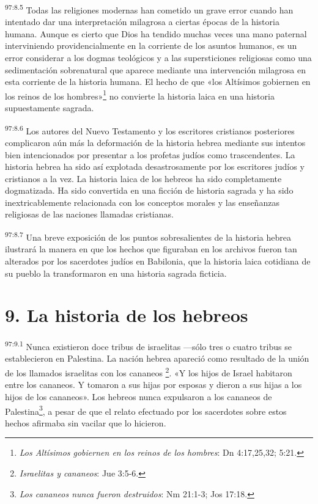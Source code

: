 \par
\textsuperscript{97:8.5} Todas las religiones modernas han cometido un grave error cuando han intentado dar una interpretación milagrosa a ciertas épocas de la historia humana. Aunque es cierto que Dios ha tendido muchas veces una mano paternal interviniendo providencialmente en la corriente de los asuntos humanos, es un error considerar a los dogmas teológicos y a las supersticiones religiosas como una sedimentación sobrenatural que aparece mediante una intervención milagrosa en esta corriente de la historia humana. El hecho de que «los Altísimos gobiernen en los reinos de los hombres»\footnote{\textit{Los Altísimos gobiernen en los reinos de los hombres}: Dn 4:17,25,32; 5:21.} no convierte la historia laica en una historia supuestamente sagrada.

\par
\textsuperscript{97:8.6} Los autores del Nuevo Testamento y los escritores cristianos posteriores complicaron aún más la deformación de la historia hebrea mediante sus intentos bien intencionados por presentar a los profetas judíos como trascendentes. La historia hebrea ha sido así explotada desastrosamente por los escritores judíos y cristianos a la vez. La historia laica de los hebreos ha sido completamente dogmatizada. Ha sido convertida en una ficción de historia sagrada y ha sido inextricablemente relacionada con los conceptos morales y las enseñanzas religiosas de las naciones llamadas cristianas.

\par
\textsuperscript{97:8.7} Una breve exposición de los puntos sobresalientes de la historia hebrea ilustrará la manera en que los hechos que figuraban en los archivos fueron tan alterados por los sacerdotes judíos en Babilonia, que la historia laica cotidiana de su pueblo la transformaron en una historia sagrada ficticia.

\section*{9. La historia de los hebreos}
\par
\textsuperscript{97:9.1} Nunca existieron doce tribus de israelitas ---sólo tres o cuatro tribus se establecieron en Palestina. La nación hebrea apareció como resultado de la unión de los llamados israelitas con los cananeos \footnote{\textit{Israelitas y cananeos}: Jue 3:5-6.}. «Y los hijos de Israel habitaron entre los cananeos. Y tomaron a sus hijas por esposas y dieron a sus hijas a los hijos de los cananeos». Los hebreos nunca expulsaron a los cananeos de Palestina\footnote{\textit{Los cananeos nunca fueron destruidos}: Nm 21:1-3; Jos 17:18.}, a pesar de que el relato efectuado por los sacerdotes sobre estos hechos afirmaba sin vacilar que lo hicieron.

